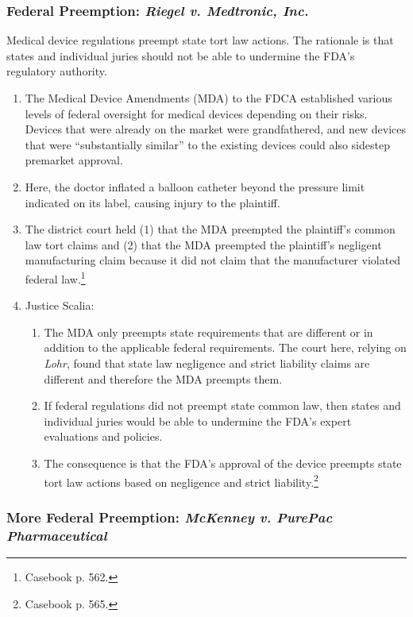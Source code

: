 \subsubsection{Federal Preemption: \emph{Riegel v. Medtronic, Inc.}}

Medical device regulations preempt state tort law actions. The rationale is 
that states and individual juries should not be able to undermine the FDA's 
regulatory authority.

\begin{enumerate}
    \item The Medical Device Amendments (MDA) to the FDCA established various 
    levels of federal oversight for medical devices depending on their risks.  
    Devices that were already on the market were grandfathered, and new devices 
    that were ``substantially similar'' to the existing devices could also 
    sidestep premarket approval.
    \item Here, the doctor inflated a balloon catheter beyond the pressure limit 
    indicated on its label, causing injury to the plaintiff.
    \item The district court held (1) that the MDA preempted the plaintiff's 
    common law tort claims and (2) that the MDA preempted the plaintiff's 
    negligent manufacturing claim because it did not claim that the manufacturer 
    violated federal law.\footnote{Casebook p. 562.}
    \item Justice Scalia:
    \begin{enumerate}
        \item The MDA only preempts state requirements that are different or in 
        addition to the applicable federal requirements. The court here, relying 
        on \emph{Lohr}, found that state law negligence and strict liability 
        claims are different and therefore the MDA preempts them.
        \item If federal regulations did not preempt state common law, then 
        states and individual juries would be able to undermine the FDA's expert 
        evaluations and policies.
        \item The consequence is that the FDA's approval of the device preempts 
        state tort law actions based on negligence and strict 
        liability.\footnote{Casebook p. 565.}
    \end{enumerate}
\end{enumerate}

\subsubsection{More Federal Preemption: \emph{McKenney v. PurePac Pharmaceutical}}

